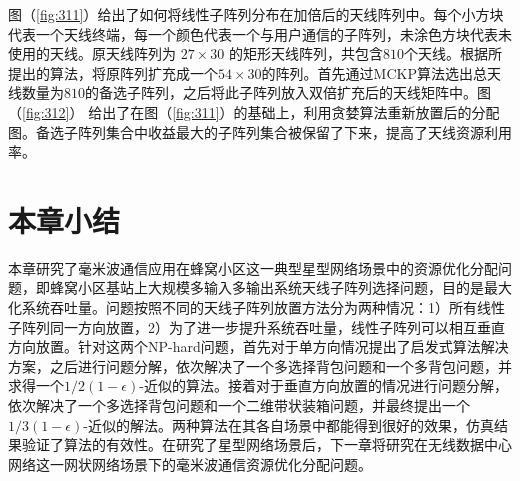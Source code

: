 图（\ref{fig:311}）给出了如何将线性子阵列分布在加倍后的天线阵列中。每个小方块代表一个天线终端，每一个颜色代表一个与用户通信的子阵列，未涂色方块代表未使用的天线。原天线阵列为 $27\times30$ 的矩形天线阵列，共包含$810$个天线。根据所提出的算法，将原阵列扩充成一个$54\times 30$的阵列。首先通过MCKP算法选出总天线数量为$810$的备选子阵列，之后将此子阵列放入双倍扩充后的天线矩阵中。图（\ref{fig:312}） 给出了在图（\ref{fig:311}）的基础上，利用贪婪算法重新放置后的分配图。备选子阵列集合中收益最大的子阵列集合被保留了下来，提高了天线资源利用率。

\section{本章小结}

本章研究了毫米波通信应用在蜂窝小区这一典型星型网络场景中的资源优化分配问题，即蜂窝小区基站上大规模多输入多输出系统天线子阵列选择问题，目的是最大化系统吞吐量。问题按照不同的天线子阵列放置方法分为两种情况：1）所有线性子阵列同一方向放置，2）为了进一步提升系统吞吐量，线性子阵列可以相互垂直方向放置。针对这两个NP-hard问题，首先对于单方向情况提出了启发式算法解决方案，之后进行问题分解，依次解决了一个多选择背包问题和一个多背包问题，并求得一个$1/2(1-\epsilon)$-近似的算法。接着对于垂直方向放置的情况进行问题分解，依次解决了一个多选择背包问题和一个二维带状装箱问题，并最终提出一个$1/3(1-\epsilon)$-近似的解法。两种算法在其各自场景中都能得到很好的效果，仿真结果验证了算法的有效性。在研究了星型网络场景后，下一章将研究在无线数据中心网络这一网状网络场景下的毫米波通信资源优化分配问题。
